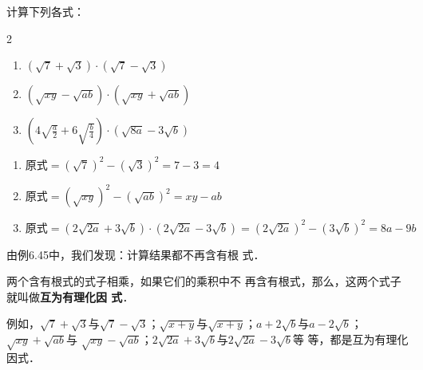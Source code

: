 \begin{example}
    计算下列各式：
\begin{multicols}{2}
    \begin{enumerate}
    \item $\left(\sqrt{7}+\sqrt{3}\right)\cdot \left(\sqrt{7}-\sqrt{3}\right)$
    \item $\left(\sqrt{xy}-\sqrt{ab}\right)\cdot \left(\sqrt{xy}+\sqrt{ab}\right)$
    \item $\left(4\sqrt{\frac{a}{2}}+6\sqrt{\frac{b}{4}}\right)\cdot \left(\sqrt{8a}-3\sqrt{b}\right)$
\end{enumerate}
\end{multicols}
\end{example}

\begin{solution}
    \begin{enumerate}
        \item $\text{原式}=\left(\sqrt{7}\right)^2-\left(\sqrt{3}\right)^2=7-3=4$
        \item $\text{原式}=\left(\sqrt{xy}\right)^2-\left(\sqrt{ab}\right)^2=xy-ab$
        \item $\text{原式}=\left(2\sqrt{2a}+3\sqrt{b}\right)\cdot\left(2\sqrt{2a}-3\sqrt{b}\right)=\left(2\sqrt{2a}\right)^2-\left(3\sqrt{b}\right)^2=8a-9b$
    \end{enumerate}    
\end{solution}

由例6.45中，我们发现：计算结果都不再含有根
式．

两个含有根式的式子相乘，如果它们的乘积中不
再含有根式，那么，这两个式子就叫做\textbf{互为有理化因
式}．

例如，$\sqrt{7}+\sqrt{3}$与$\sqrt{7}-\sqrt{3}$；$\sqrt{x+y}$与$\sqrt{x+y}$；$a+2\sqrt{b}$与$a-2\sqrt{b}$；$\sqrt{xy}+\sqrt{ab}$与
$\sqrt{xy}-\sqrt{ab}$；$2\sqrt{2a}+3\sqrt{b}$与$2\sqrt{2a}-3\sqrt{b}$等
等，都是互为有理化因式．


